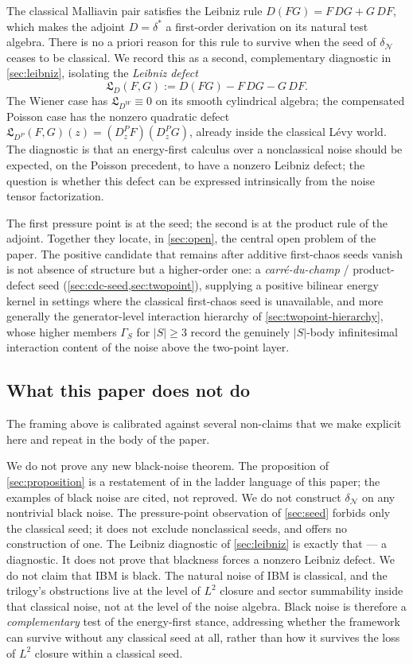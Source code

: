 \documentclass[11pt,reqno]{amsart}
\theoremstyle{plain}
\theoremstyle{definition}
\theoremstyle{remark}
\begin{document}
The classical Malliavin pair satisfies the Leibniz rule
$D(FG)=F\,DG+G\,DF$, which makes the adjoint $D=\delta^{*}$ a
first-order derivation on its natural test algebra. There is no a
priori reason for this rule to survive when the seed of
$\delta_{\mathcal N}$ ceases to be classical. We record this as a
second, complementary diagnostic in \cref{sec:leibniz}, isolating the
\emph{Leibniz defect}
\[
  \mathfrak L_D(F,G):=D(FG)-F\,DG-G\,DF.
\]
The Wiener case has $\mathfrak L_{D^W}\equiv 0$ on its smooth
cylindrical algebra; the compensated Poisson case has the nonzero
quadratic defect $\mathfrak L_{D^P}(F,G)(z)=(D^P_z F)(D^P_z G)$,
already inside the classical L\'evy world. The diagnostic is that an
energy-first calculus over a nonclassical noise should be expected,
on the Poisson precedent, to have a nonzero Leibniz defect; the
question is whether this defect can be expressed intrinsically from
the noise tensor factorization.

The first pressure point is at the seed; the second is at the
product rule of the adjoint. Together they locate, in
\cref{sec:open}, the central open problem of the paper. The positive
candidate that remains after additive first-chaos seeds vanish is
not absence of structure but a higher-order one: a
\emph{carr\'e-du-champ} / product-defect seed
(\cref{sec:cdc-seed,sec:twopoint}), supplying a positive bilinear
energy kernel in settings where the classical first-chaos seed is
unavailable, and more generally the generator-level interaction
hierarchy of \cref{sec:twopoint-hierarchy}, whose higher members
$\Gamma_{S}$ for $|S|\ge 3$ record the genuinely $|S|$-body
infinitesimal interaction content of the noise above the two-point
layer.

\subsection{What this paper does not do}\label{sec:intro-non-claims}

The framing above is calibrated against several non-claims that we
make explicit here and repeat in the body of the paper.

We do not prove any new black-noise theorem. The proposition of
\cref{sec:proposition} is a restatement of \cite{Tsirelson2004} in
the ladder language of this paper; the examples of black noise are
cited, not reproved. We do not construct $\delta_{\mathcal N}$ on any
nontrivial black noise. The pressure-point observation of
\cref{sec:seed} forbids only the classical seed; it does not exclude
nonclassical seeds, and offers no construction of one. The Leibniz
diagnostic of \cref{sec:leibniz} is exactly that --- a diagnostic.
It does not prove that blackness forces a nonzero Leibniz defect.
We do not claim that IBM is black. The natural noise of IBM is
classical, and the trilogy's obstructions live at the level of
$L^2$ closure and sector summability inside that classical noise,
not at the level of the noise algebra. Black noise is therefore a
\emph{complementary} test of the energy-first stance, addressing
whether the framework can survive without any classical seed at all,
rather than how it survives the loss of $L^2$ closure within a
classical seed.
\end{document}
